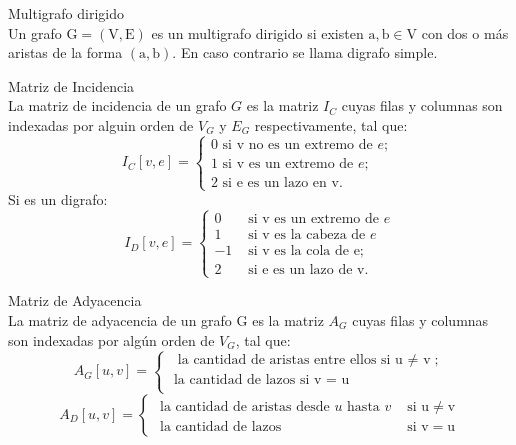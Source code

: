 \documentclass{article}
\begin{document}
\begin{defn}
Multigrafo dirigido \\ Un grafo $\mathrm{G}=(\mathrm{V}, \mathrm{E})$ es un multigrafo dirigido si existen $\mathrm{a}, \mathrm{b} \in \mathrm{V}$ con dos o más aristas de la forma $(\mathrm{a}, \mathrm{b})$. En caso contrario se llama digrafo simple.
\end{defn}

\begin{defn}
Matriz de Incidencia \\ La matriz de incidencia de un grafo $G$ es la matriz $I_{C}$ cuyas filas y columnas son indexadas por alguin orden de $V_{G}$ y $E_{G}$ respectivamente, tal que:
$$I_{C}[v, e]=\left\{\begin{array}{l}0 \text { si v no es un extremo de } e \text {; } \\ 1 \text { si v es un extremo de } e \text {; } \\ 2 \text { si e es un lazo en v. }\end{array}\right.$$ Si es un digrafo:
$$I_{D}[v, e]=\left\{\begin{array}{ll}0 & \text { si } \mathrm{v} \text { es un extremo de } e \\ 1 & \text { si } \mathrm{v} \text { es la cabeza de } e \\ -1 & \text { si } \mathrm{v} \text { es la cola de } \mathrm{e} ; \\ 2 & \text { si e es un lazo de } \mathrm{v} .\end{array}\right.$$
\end{defn}

\begin{defn}
Matriz de Adyacencia \\ La matriz de adyacencia de un grafo $\mathrm{G}$ es la matriz $A_{G}$ cuyas filas y columnas son indexadas por algún orden de $V_{G}$, tal que:
$$A_{G}[u, v]=\left\{\begin{array}{l}\text { la cantidad de aristas entre ellos si u $\neq$ v} ; \\ \text { la cantidad de lazos si v = u} \\ \end{array}\right.$$
$$A_{D}[u, v]=\left\{\begin{array}{ll}\text { la cantidad de aristas desde } u \text { hasta } v & \text { si } \mathrm{u} \neq \mathrm{v} \\ \text { la cantidad de lazos } & \text { si } \mathrm{v}=\mathrm{u}\end{array}\right.$$
\end{defn}
\end{document}
